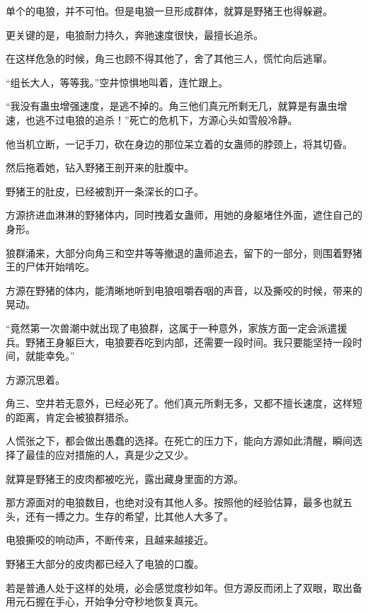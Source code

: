 \begin{this_body}
单个的电狼，并不可怕。但是电狼一旦形成群体，就算是野猪王也得躲避。

更关键的是，电狼耐力持久，奔驰速度很快，最擅长追杀。

在这样危急的时候，角三也顾不得其他了，舍了其他三人，慌忙向后逃窜。

“组长大人，等等我。”空井惊惧地叫着，连忙跟上。

“我没有蛊虫增强速度，是逃不掉的。角三他们真元所剩无几，就算是有蛊虫增速，也逃不过电狼的追杀！”死亡的危机下，方源心头如雪般冷静。

他当机立断，一记手刀，砍在身边的那位呆立着的女蛊师的脖颈上，将其切昏。

然后拖着她，钻入野猪王剖开来的肚腹中。

野猪王的肚皮，已经被割开一条深长的口子。

方源挤进血淋淋的野猪体内，同时拽着女蛊师，用她的身躯堵住外面，遮住自己的身形。

狼群涌来，大部分向角三和空井等等撤退的蛊师追去，留下的一部分，则围着野猪王的尸体开始啃吃。

方源在野猪的体内，能清晰地听到电狼咀嚼吞咽的声音，以及撕咬的时候，带来的晃动。

“竟然第一次兽潮中就出现了电狼群，这属于一种意外，家族方面一定会派遣援兵。野猪王身躯巨大，电狼要吞吃到内部，还需要一段时间。我只要能坚持一段时间，就能幸免。”

方源沉思着。

角三、空井若无意外，已经必死了。他们真元所剩无多，又都不擅长速度，这样短的距离，肯定会被狼群猎杀。

人慌张之下，都会做出愚蠢的选择。在死亡的压力下，能向方源如此清醒，瞬间选择了最佳的应对措施的人，真是少之又少。

就算是野猪王的皮肉都被吃光，露出藏身里面的方源。

那方源面对的电狼数目，也绝对没有其他人多。按照他的经验估算，最多也就五头，还有一搏之力。生存的希望，比其他人大多了。

电狼撕咬的响动声，不断传来，且越来越接近。

野猪王大部分的皮肉都已经入了电狼的口腹。

若是普通人处于这样的处境，必会感觉度秒如年。但方源反而闭上了双眼，取出备用元石握在手心，开始争分夺秒地恢复真元。

\end{this_body}

